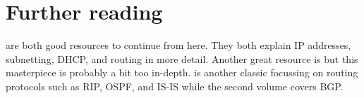 \section{Further reading}
\label{sec:ip-reading}
\textcite{lammle-ccna,lammle-comptia} are both good resources to continue from here.
They both explain \acs{IP} addresses, subnetting, \acs{DHCP}, and routing in more detail.
Another great resource is \textcite{stevens} but this masterpiece is probably a bit too in-depth.
\textcite{doyle} is another classic focussing on routing protocols such as \acs{RIP}, \acs{OSPF}, and \acs{IS-IS} while the second volume covers \acs{BGP}.